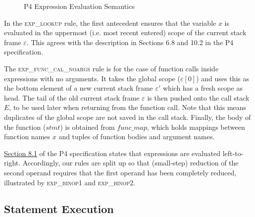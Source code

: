 \documentclass[UTF8]{article}
\begin{document}
\begin{figure}[h!]
\caption{P4 Expression Evaluation Semantics}
\label{fig:semexp}
\end{figure}

In the \textsc{exp\_lookup} rule, the first antecedent ensures that the variable $x$ is evaluated in the uppermost (i.e. most recent entered) scope of the current stack frame $\varepsilon$. This agrees with the description in Sections 6.8 and 10.2 in the P4 specification.

The \textsc{exp\_func\_cal\_noargs} rule is for the case of function calls inside expressions with no arguments. It takes the global scope ($\varepsilon [0]$) and uses this as the bottom element of a new current stack frame $\varepsilon '$ which has a fresh scope as head. The tail of the old current stack frame $\varepsilon$ is then pushed onto the call stack $E$, to be used later when returning from the function call. Note that this means duplicates of the global scope are not saved in the call stack. Finally, the body of the function ($\mathit{stmt}$) is obtained from $\mathit{func\_map}$, which holds mappings between function names $x$ and tuples of function bodies and argument names.

\href{https://p4.org/p4-spec/docs/P4-16-v1.2.1.html#sec-expr-eval-order}{Section 8.1} of the P4 specification states that expressions are evaluated left-to-right. Accordingly, our rules are split up so that (small-step) reduction of the second operand requires that the first operand has been completely reduced, illustrated by \textsc{exp\_binop1} and \textsc{exp\_binop2}.

\newpage
\subsection{Statement Execution}
\end{document}
